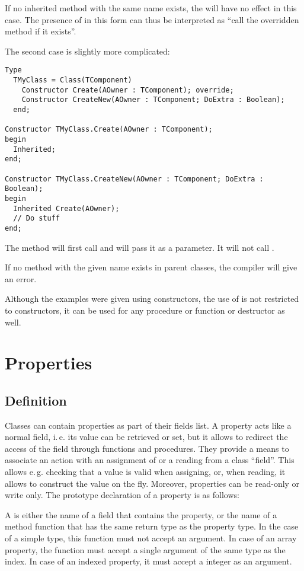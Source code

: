If no inherited method with the same name exists, the  will have
no effect in this case. The presence of  in this form can thus
be interpreted as ``call the overridden method if it exists''.

The second case is slightly more complicated:
\begin{verbatim}
Type
  TMyClass = Class(TComponent)
    Constructor Create(AOwner : TComponent); override;
    Constructor CreateNew(AOwner : TComponent; DoExtra : Boolean);
  end;

Constructor TMyClass.Create(AOwner : TComponent);
begin
  Inherited;
end;

Constructor TMyClass.CreateNew(AOwner : TComponent; DoExtra : Boolean);
begin
  Inherited Create(AOwner);
  // Do stuff
end;
\end{verbatim}
The  method will first call  and
will pass it  as a parameter. It will not call
.

If no method with the given name exists in parent classes, the compiler will
give an error.

Although the examples were given using constructors, the use of
 is not restricted to constructors, it can be used
for any procedure or function or destructor as well.

\section{Properties}
\subsection{Definition}
Classes can contain properties as part of their fields list. A property
acts like a normal field, i.\,e. its value can be retrieved or set, but it
allows to redirect the access of the field through functions and
procedures. They provide a means to associate an action with an assignment
of or a reading from a class ``field''. This allows e.\,g. checking that a
value is valid when assigning, or, when reading, it allows to construct the
value on the fly. Moreover, properties can be read-only or write only.
The prototype declaration of a property is as follows:


A   is either the name of a field that contains the
property, or the name of a method function that has the same return type as
the property type. In the case of a simple type, this
function must not accept an argument. In case of an array property, the
function must accept a single argument of the same type as the index.
In case of an indexed property, it must accept a integer as an argument.


